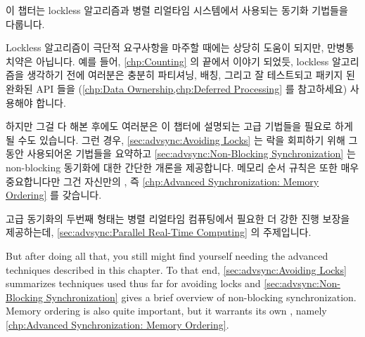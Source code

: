 
%

이 챕터는 lockless 알고리즘과 병렬 리얼타임 시스템에서 사용되는 동기화 기법들을
다룹니다.

Lockless 알고리즘이 극단적 요구사항을 마주할 때에는 상당히 도움이 되지만,
만병통치약은 아닙니다.
예를 들어, \cref{chp:Counting} 의 끝에서 이야기 되었듯, lockless 알고리즘을
생각하기 전에 여러분은 충분히 파티셔닝, 배칭, 그리고 잘 테스트되고 패키지 된
완화된 API 들을
(\cref{chp:Data Ownership,chp:Deferred Processing} 를 참고하세요)
사용해야 합니다.

\iffalse

This chapter covers synchronization techniques used for lockless
algorithms and parallel real-time systems.

Although lockless algorithms can be quite helpful when faced with
extreme requirements, they are no panacea.
For example, as noted at the end of \cref{chp:Counting},
you should thoroughly apply partitioning, batching, and
well-tested packaged weak APIs
(see \cref{chp:Data Ownership,chp:Deferred Processing})
before even thinking about lockless algorithms.

\fi

하지만 그걸 다 해본 후에도 여러분은 이 챕터에 설명되는 고급 기법들을 필요로
하게 될 수도 있습니다.
그런 경우,
\cref{sec:advsync:Avoiding Locks}
는 락을 회피하기 위해 그동안 사용되어온 기법들을 요약하고
\cref{sec:advsync:Non-Blocking Synchronization}
는 non-blocking 동기화에 대한 간단한 개론을 제공합니다.
메모리 순서 규칙은 또한 매우 중요합니다만 그건 자신만의
, 즉
\cref{chp:Advanced Synchronization: Memory Ordering} 를 갖습니다.

고급 동기화의 두번째 형태는 병렬 리얼타임 컴퓨팅에서 필요한 더 강한 진행 보장을
제공하는데,
\cref{sec:advsync:Parallel Real-Time Computing} 의 주제입니다.

\iffalse

But after doing all that, you still might find yourself needing the
advanced techniques described in this chapter.
To that end,
\cref{sec:advsync:Avoiding Locks}
summarizes techniques used thus far for avoiding locks and
\cref{sec:advsync:Non-Blocking Synchronization}
gives a brief overview of non-blocking synchronization.
Memory ordering is also quite important, but it warrants its own
, namely
\cref{chp:Advanced Synchronization: Memory Ordering}.

